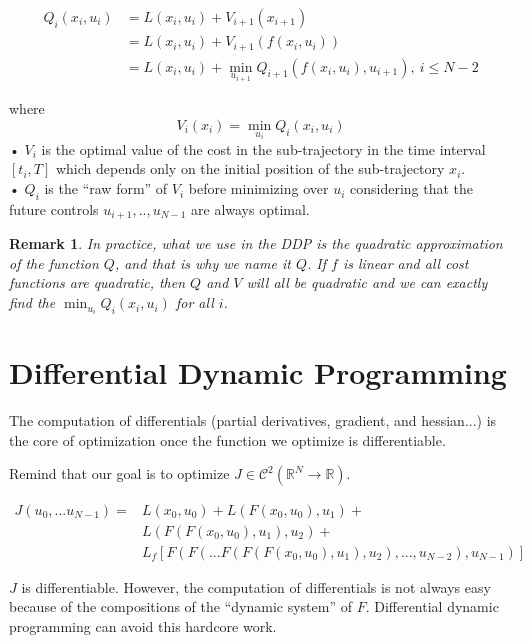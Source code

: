 \documentclass{report}
\newtheorem*{remark}{Remark}
\begin{document}
\begin{equation}
\begin{split}
Q_i(x_i,u_i) &= L(x_i,u_i) + V_{i+1}(x_{i+1}) \\
				&= L(x_i,u_i) + V_{i+1}(f(x_i,u_i)) \\
				&= L(x_i,u_i) + \min_{u_{i+1}} Q_{i+1}(f(x_i,u_i), u_{i+1}),\ i \le N-2
\end{split}
\end{equation}

where
\begin{equation}
V_i(x_i) = \min_{u_i} Q_i(x_i, u_i) 
\end{equation}•
$V_i$ is the optimal value of the cost in the sub-trajectory in the time interval $[t_i, T]$ which depends only on the initial position of the sub-trajectory $x_i$.
\\•
$Q_i$ is the ``raw form'' of $V_i$ before minimizing over $u_i$ considering that the future controls $u_{i+1}, .., u_{N-1}$ are always optimal. 

\begin{remark}
In practice, what we use in the DDP is the quadratic approximation of the function $Q$, and that is why we name it $Q$. If $f$ is linear and all cost functions are quadratic, then $Q$ and $V$ will all be quadratic and we can exactly find the $\min_{u_i} Q_i(x_i, u_i) $ for all $i$.
\end{remark}

\chapter{Differential Dynamic Programming}

The computation of differentials (partial derivatives, gradient, and hessian...) is the core of optimization once the function we optimize is differentiable.

Remind that our goal is to optimize $J \in \mathscr{C}^2 (\mathbb{R}^N \to \mathbb{R})$.

\begin{equation}
\begin{split}
J(u_0, ...u_{N-1}) = &L(x_0, u_0) + L(F(x_0, u_0), u_1) + \\
	&L(F(F(x_0, u_0), u_1), u_2) + \\
	&L_f[F(F(...F(F(F(x_0, u_0), u_1), u_2), ..., u_{N-2}) ,u_{N-1})]
\end{split}
\end{equation}

$J$ is differentiable. However, the computation of differentials is not always easy because of the compositions of the ``dynamic system'' of $F$. Differential dynamic programming can avoid this hardcore work.
\end{document}
